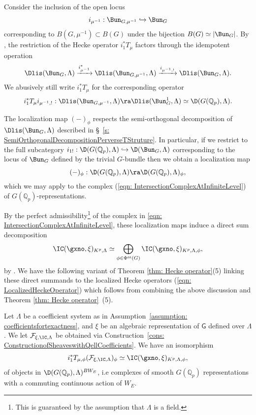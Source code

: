 \documentclass[letterpaper,11pt]{amsart}
\begin{document}
Consider the inclusion of the open locus 
\[i_{\mu^{-1}}: \Bun_{G,\mu^{-1}} \hookrightarrow \Bun_{G}\]
corresponding to $B(G,\mu^{-1}) \subset B(G)$ under the bijection $B(G) \simeq |\Bun_{G}|$. By \cite[Proposition~A.9]{RapAppendixtoPadicCohomology}, the restriction of the Hecke operator $i_{1}^\ast T_{\mu}$ factors through the idempotent operation
\[\Dlis(\Bun_{G},\Lambda)\xrightarrow{i_{\mu^{-1}}^\ast}  \Dlis(\Bun_{G,\mu^{-1}},\Lambda) \xrightarrow{i_{\mu^{-1},!}}\Dlis(\Bun_{G},\Lambda).\]
We abusively still write $i_{1}^{*}T_{\mu}$ for the corresponding operator 
\[ i_{1}^{*}T_{\mu}i_{\mu^{-1},!}: \Dlis(\Bun_{G,\mu^{-1}},\Lambda) \ra \Dlis(\Bun_G^1,\Lambda)\simeq\D(G(\mathbb{Q}_{p}),\Lambda).\]


The localization map $(-)_{\phi}$ respects the semi-orthogonal decomposition of $\Dlis(\Bun_{G},\Lambda)$ described in \S~\ref{s: SemiOrthogonalDecompositionPerverseTStruture}. In particular, if we restrict to the full subcategory $i_{1!}: \D(G(\mathbb{Q}_{p}),\Lambda) \hookrightarrow \D(\Bun_{G},\Lambda)$ corresponding to the locus of $\Bun_{G}$ defined by the trivial $G$-bundle then we obtain a localization map 
\[ (-)_{\phi}: \D(G(\mathbb{Q}_{p}),\Lambda) \ra \D(G(\mathbb{Q}_{p}),\Lambda)_{\phi}, \]
which we may apply to the complex (\ref{eqn: IntersectionComplexAtInfiniteLevel}) of $G(\mathbb{Q}_{p})$-representations. 

By the perfect admissibility\footnote{This is guaranteed by the assumption that $\Lambda$ is a field.} of the complex in \eqref{eqn: IntersectionComplexAtInfiniteLevel}, these localization maps induce a direct sum decomposition
\begin{equation}{\label{eqn: directsumdecompositionoverparameters}}
 \IC(\gxno,\xi)_{K^{p},\Lambda} \simeq \bigoplus_{\phi \in \Phi^{\mathrm{ss}}(G)} \IC(\gxno,\xi)_{K^{p},\Lambda,\phi}, 
\end{equation}
by \cite[Proposition~A.5.]{HamannLeeTorsion}. We have the following variant of Theorem \ref{thm: Hecke operator}(5) linking these direct summands to the localized Hecke operators (\ref{eqn: LocalizedHeckeOperator}) which follows from combining the above discussion and Theorem \ref{thm: Hecke operator}~(5).

\begin{corollary}{\label{cor: phiisotyicpartcalculation}}
Let $\Lambda$ be a coefficient system as in Assumption~\ref{assumption: coefficientsfortexactness}, and $\xi$ be an algebraic representation of $\mathsf{G}$ defined over $\Lambda$. We let $\mathcal{F}_{\xi,\IC,\Lambda}$ be obtained via Construction~\ref{cons: ConstructionofSheaveswithQellCoefficients}.  
We have an isomorphism
\[ i_{1}^{*}T_{\mu,\phi}(\mathcal{F}_{\xi,\IC,\Lambda})_{\phi} \simeq \IC(\gxno,\xi)_{K^{p},\Lambda,\phi}, \]
of objects in $\D(G(\mathbb{Q}_{p}),\Lambda)^{BW_{E}}$, i.e complexes of smooth $G(\mathbb{Q}_{p})$ representations with a commuting continuous action of $W_{E}$.
\end{corollary}
\end{document}

